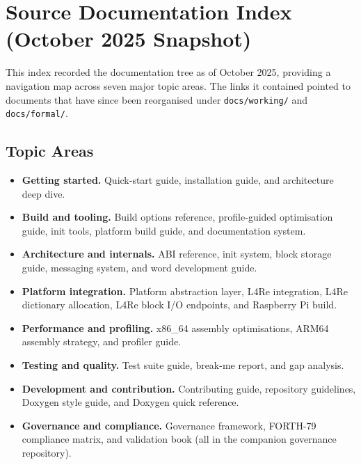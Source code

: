 
\section{Source Documentation Index (October 2025 Snapshot)}

This index recorded the documentation tree as of October 2025, providing a navigation
map across seven major topic areas. The links it contained pointed to documents that have
since been reorganised under \texttt{docs/working/} and \texttt{docs/formal/}.

\subsection{Topic Areas}

\begin{itemize}
  \item \textbf{Getting started.} Quick-start guide, installation guide, and architecture
        deep dive.
  \item \textbf{Build and tooling.} Build options reference, profile-guided optimisation
        guide, init tools, platform build guide, and documentation system.
  \item \textbf{Architecture and internals.} ABI reference, init system, block storage
        guide, messaging system, and word development guide.
  \item \textbf{Platform integration.} Platform abstraction layer, L4Re integration,
        L4Re dictionary allocation, L4Re block I/O endpoints, and Raspberry Pi build.
  \item \textbf{Performance and profiling.} x86\_64 assembly optimisations, ARM64
        assembly strategy, and profiler guide.
  \item \textbf{Testing and quality.} Test suite guide, break-me report, and gap
        analysis.
  \item \textbf{Development and contribution.} Contributing guide, repository guidelines,
        Doxygen style guide, and Doxygen quick reference.
  \item \textbf{Governance and compliance.} Governance framework, FORTH-79 compliance
        matrix, and validation book (all in the companion governance repository).
\end{itemize}

